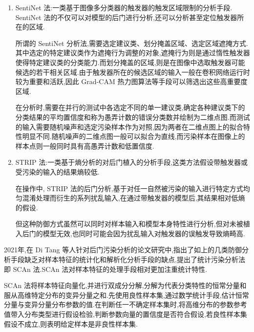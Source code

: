 \begin{enumerate}
	\item SentiNet 法:一类基于图像多分类器的触发器的触发区域限制的分析手段. SentiNet 法的不仅可以对模型的后门进行分析,还可以分析甚至定位触发器所在的区域.
	
	所谓的 SentiNet 分析法,需要选定建议类、划分掩盖区域、选定区域遮掩方式.其中选定的特定建议类作为遮掩行为调整的对象,遮掩行为则是通过惰性触发器使得特定建议类的分类能力.而划分掩盖的区域,则是在图像中选取触发器可能候选的若干相关区域.由于触发器所在的候选区域的输入一般在卷积网络运行时较为重要和活跃,因此 Grad-CAM 热力图算法等手段可以筛选出这些高重要度区域.
	
	在分析时,需要在并行的测试中各选定不同的单一建议类,确定各种建议类下的分类结果的平均置信度和称为愚弄计数的错误分类数并绘制为二维点图.而测试的输入需要随机噪声和选定污染样本作为对照,因为两者在二维点图上的拟合特性明显不同.随机噪声的二维点图一般可以拟合为直线,而污染样本在图像上的样本点则一般同时具有高愚弄计数和低置信度.
	
	\item STRIP 法:一类基于熵分析的对后门植入的分析手段,这类方法假设带触发器或受污染的输入的结果熵较低.
	
	在操作中, STRIP 法的后门分析,基于对任一自然被污染的输入进行特定方式均匀混淆处理而衍生的系列扰乱输入,在通过带触发器的模型后,其结果相对低熵的假设.
	
	但这种防御方式虽然可以同时对样本输入和模型本身特性进行分析,但对未被植入后门的模型无效,也同时可能会因为扰乱输入对触发器的误触发导致熵畸高.
	 
\end{enumerate}

2021年,在 Di Tang 等人针对后门污染分析的论文研究中,指出了如上的几类防御分析手段缺乏对样本特征的统计化和解析化分析手段的缺点,提出了统计污染分析法即 SCAn 法.SCAn 法对样本特征的处理手段相对更加注重统计特性.

SCAn 法将样本特征向量化,并进行双成分分解,分解为代表分类特性的恒常分量和服从高维特定分布的变异分量之和.先使用良性样本集,通过数学统计手段,估计恒常分量与变异分量分布参数的值.在判断任一不确定样本集时,将高维分布的参数参考值带入分布类型进行假设检验,判断参数向量的置信度是否符合假设,若良性样本集假设不成立,则表明给定样本是非良性样本集.

